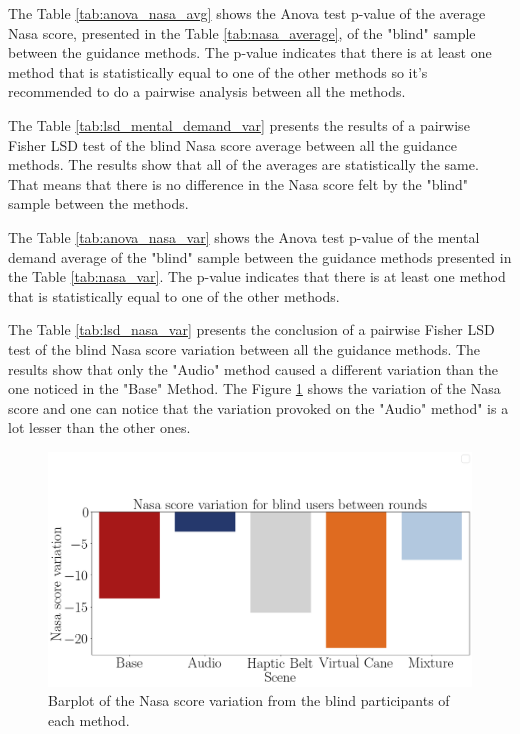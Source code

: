 The Table \ref{tab:anova_nasa_avg} shows the Anova test p-value of the average Nasa score, presented in the Table \ref{tab:nasa_average}, of the "blind" sample between the guidance methods. The p-value indicates that there is at least one method that is statistically equal to one of the other methods so it's recommended to do a pairwise analysis between all the methods.



The Table \ref{tab:lsd_mental_demand_var} presents the results of a pairwise Fisher LSD test of the blind Nasa score average between all the guidance methods. The results show that all of the averages are statistically the same. That means that there is no difference in the Nasa score felt by the "blind" sample between the methods.



The Table \ref{tab:anova_nasa_var} shows the Anova test p-value of the mental demand average of the "blind" sample between the guidance methods presented in the Table \ref{tab:nasa_var}. The p-value indicates that there is at least one method that is statistically equal to one of the other methods.





The Table \ref{tab:lsd_nasa_var} presents the conclusion of a pairwise Fisher LSD test of the blind Nasa score variation between all the guidance methods. The results show that only the "Audio" method caused a different variation than the one noticed in the "Base" Method. The Figure \ref{fig:barplot_nasa_var_scene_blind} shows the variation of the Nasa score and one can notice that the variation provoked on the "Audio" method" is a lot lesser than the other ones.





\begin{figure}[!htb]
    \centering
    \includegraphics[width = 0.8\linewidth]{Resultados/Nasa/Figuras/png/barplot_nasa_var_scene_blind.png}
    \caption{Barplot of the Nasa score variation from the blind participants of each method.}
    \label{fig:barplot_nasa_var_scene_blind}
\end{figure}

